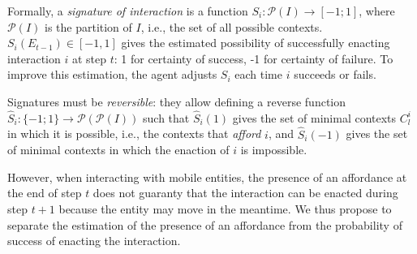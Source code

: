 \documentclass[conference]{IEEEtran}
\begin{document}

Formally, a \textit{signature of interaction} is a function $S_i : \mathcal{P}(I) \rightarrow [-1;1]$, where $\mathcal{P}(I)$ is the partition of $I$, i.e., the set of all possible contexts.
$S_i(E_{t-1}) \in [-1, 1]$ gives the estimated possibility of successfully enacting interaction $i$ at step $t$: 1 for certainty of success, -1 for certainty of failure. 
To improve this estimation, the agent adjusts $S_i$ each time $i$ succeeds or fails. %

Signatures must be \textit{reversible}: they allow defining a reverse function $\hat{S}_i : \{-1;1\} \rightarrow \mathcal{P}(\mathcal{P}(I))$ such that  $\hat{S}_i(1)$ gives the set of minimal contexts $C_l^i$ in which it is possible, i.e., the contexts that \textit{afford} $i$, and $\hat{S}_i(-1)$ gives the set of minimal contexts in which the enaction of $i$ is impossible.




However, when interacting with mobile entities, the presence of an affordance at the end of step $t$ does not guaranty that the interaction can be enacted during step $t+1$ because the entity may move in the meantime.
We thus propose to separate the estimation of the presence of an affordance from the probability of success of enacting the interaction.
\end{document}
